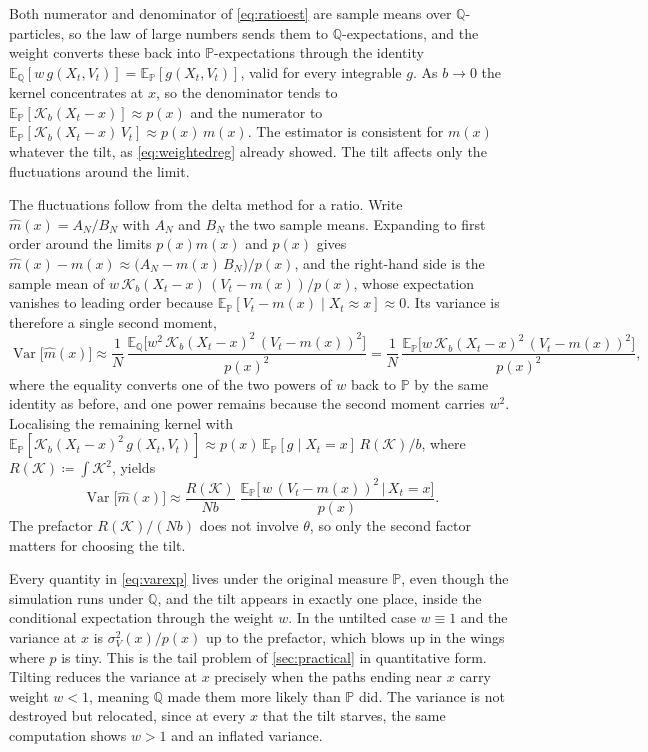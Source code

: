 \documentclass[11pt,a4paper]{article}
\theoremstyle{plain}
\theoremstyle{definition}
\theoremstyle{definition}
\newcommand{\E}{\mathbb{E}}
\newcommand{\Pm}{\mathbb{P}}
\newcommand{\Qm}{\mathbb{Q}}
\begin{document}
Both numerator and denominator of \cref{eq:ratioest} are sample means over $\Qm$-particles, so the law of large numbers sends them to $\Qm$-expectations, and the weight converts these back into $\Pm$-expectations through the identity $\E_{\Qm}[w\,g(X_t, V_t)] = \E_{\Pm}[g(X_t, V_t)]$, valid for every integrable $g$. As $b \to 0$ the kernel concentrates at $x$, so the denominator tends to $\E_{\Pm}[\mathcal{K}_b(X_t - x)] \approx p(x)$ and the numerator to $\E_{\Pm}[\mathcal{K}_b(X_t - x)\,V_t] \approx p(x)\,m(x)$. The estimator is consistent for $m(x)$ whatever the tilt, as \cref{eq:weightedreg} already showed. The tilt affects only the fluctuations around the limit.

The fluctuations follow from the delta method for a ratio. Write $\widehat m(x) = A_N/B_N$ with $A_N$ and $B_N$ the two sample means. Expanding to first order around the limits $p(x)m(x)$ and $p(x)$ gives $\widehat m(x) - m(x) \approx \bigl(A_N - m(x)\,B_N\bigr)/p(x)$, and the right-hand side is the sample mean of $w\,\mathcal{K}_b(X_t - x)\,(V_t - m(x))/p(x)$, whose expectation vanishes to leading order because $\E_{\Pm}[V_t - m(x) \mid X_t \approx x] \approx 0$. Its variance is therefore a single second moment,
\begin{equation}\label{eq:deltamethod}
  \operatorname{Var}\bigl[\widehat m(x)\bigr]
  \approx \frac{1}{N}\,\frac{\E_{\Qm}\bigl[ w^2\, \mathcal{K}_b(X_t - x)^2\,(V_t - m(x))^2 \bigr]}{p(x)^2}
  = \frac{1}{N}\,\frac{\E_{\Pm}\bigl[ w\, \mathcal{K}_b(X_t - x)^2\,(V_t - m(x))^2 \bigr]}{p(x)^2},
\end{equation}
where the equality converts one of the two powers of $w$ back to $\Pm$ by the same identity as before, and one power remains because the second moment carries $w^2$. Localising the remaining kernel with $\E_{\Pm}[\mathcal{K}_b(X_t - x)^2\, g(X_t, V_t)] \approx p(x)\,\E_{\Pm}[g \mid X_t = x]\,R(\mathcal{K})/b$, where $R(\mathcal{K}) \coloneqq \int \mathcal{K}^2$, yields
\begin{equation}\label{eq:varexp}
  \operatorname{Var}\bigl[\widehat m(x)\bigr]
  \approx \frac{R(\mathcal{K})}{N b}\;
    \frac{\E_{\Pm}\bigl[\, w\,(V_t - m(x))^2 \,\big|\, X_t = x \bigr]}{p(x)} .
\end{equation}
The prefactor $R(\mathcal{K})/(Nb)$ does not involve $\theta$, so only the second factor matters for choosing the tilt.

Every quantity in \cref{eq:varexp} lives under the original measure $\Pm$, even though the simulation runs under $\Qm$, and the tilt appears in exactly one place, inside the conditional expectation through the weight $w$. In the untilted case $w \equiv 1$ and the variance at $x$ is $\sigma_V^2(x)/p(x)$ up to the prefactor, which blows up in the wings where $p$ is tiny. This is the tail problem of \cref{sec:practical} in quantitative form. Tilting reduces the variance at $x$ precisely when the paths ending near $x$ carry weight $w < 1$, meaning $\Qm$ made them more likely than $\Pm$ did. The variance is not destroyed but relocated, since at every $x$ that the tilt starves, the same computation shows $w > 1$ and an inflated variance.
\end{document}
